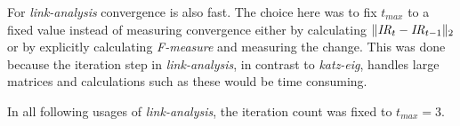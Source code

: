 
For \textit{link-analysis} convergence is also fast. The choice here was to fix $t_{max}$ to a fixed value instead of measuring convergence either by calculating $\| \mathit{IR}_t - \mathit{IR}_{t - 1} \|_2$
or by explicitly calculating \textit{F-measure} and measuring the change. This was done because the iteration step in \textit{link-analysis}, in contrast to \textit{katz-eig}, handles large matrices and calculations such as these would be time consuming.

In all following usages of \textit{link-analysis}, the iteration count was fixed to $t_{max} = 3$.

